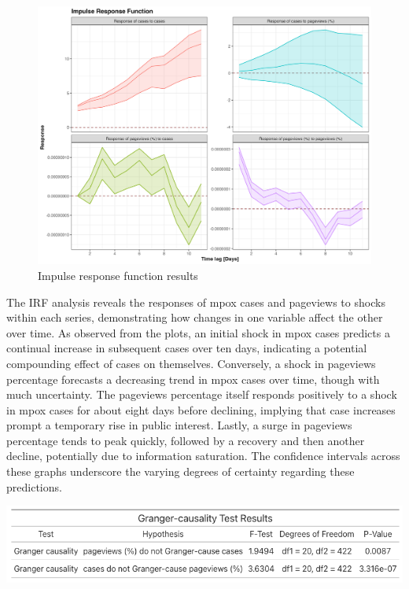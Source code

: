 \documentclass[
  12pt,
]{article}
\begin{document}
\begin{figure}[H]

{\centering \includegraphics{images/impulse-response-function.png}

}

\caption{Impulse response function results}

\end{figure}%

The IRF analysis reveals the responses of mpox cases and pageviews to
shocks within each series, demonstrating how changes in one variable
affect the other over time. As observed from the plots, an initial shock
in mpox cases predicts a continual increase in subsequent cases over ten
days, indicating a potential compounding effect of cases on themselves.
Conversely, a shock in pageviews percentage forecasts a decreasing trend
in mpox cases over time, though with much uncertainty. The pageviews
percentage itself responds positively to a shock in mpox cases for about
eight days before declining, implying that case increases prompt a
temporary rise in public interest. Lastly, a surge in pageviews
percentage tends to peak quickly, followed by a recovery and then
another decline, potentially due to information saturation. The
confidence intervals across these graphs underscore the varying degrees
of certainty regarding these predictions.

\includegraphics{images/Bildschirmfoto 2024-04-29 um 22.50.50.png}
\end{document}
